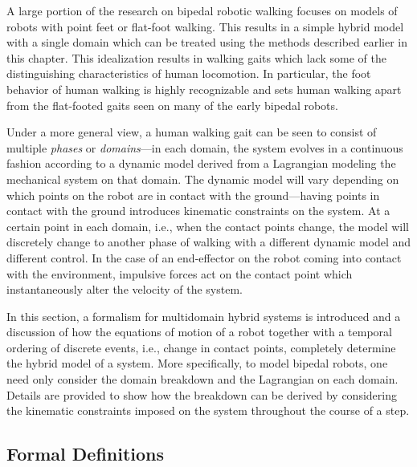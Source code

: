 %
A large portion of the research on bipedal robotic walking focuses on models of
robots with point feet or flat-foot walking.
%
This results in a simple hybrid model with a single domain which can be treated
using the methods described earlier in this chapter.
%
This idealization results in walking gaits which lack some of the distinguishing
characteristics of human locomotion.
%
In particular, the foot behavior of human walking is highly recognizable and
sets human walking apart from the flat-footed gaits seen on many of the early
bipedal robots.

Under a more general view, a human walking gait can be seen to consist of
multiple {\em phases} or {\em domains}---in each domain, the system evolves in a
continuous fashion according to a dynamic model derived from a Lagrangian
modeling the mechanical system on that domain.
%
The dynamic model will vary depending on which points on the robot are in
contact with the ground---having points in contact with the ground introduces
kinematic constraints on the system.
%
At a certain point in each domain, i.e., when the contact points change, the
model will discretely change to another phase of walking with a different
dynamic model and different control.
%
In the case of an end-effector on the robot coming into contact with the
environment, impulsive forces act on the contact point which instantaneously
alter the velocity of the system.
%

In this section, a formalism for multidomain hybrid systems is introduced and a
discussion of how the equations of motion of a robot together with a temporal
ordering of discrete events, i.e., change in contact points, completely
determine the hybrid model of a system.
%
More specifically, to model bipedal robots, one need only consider the domain
breakdown and the Lagrangian on each domain.
%
Details are provided to show how the breakdown can be derived by considering the
kinematic constraints imposed on the system throughout the course of a step.


\subsection{Formal Definitions}

